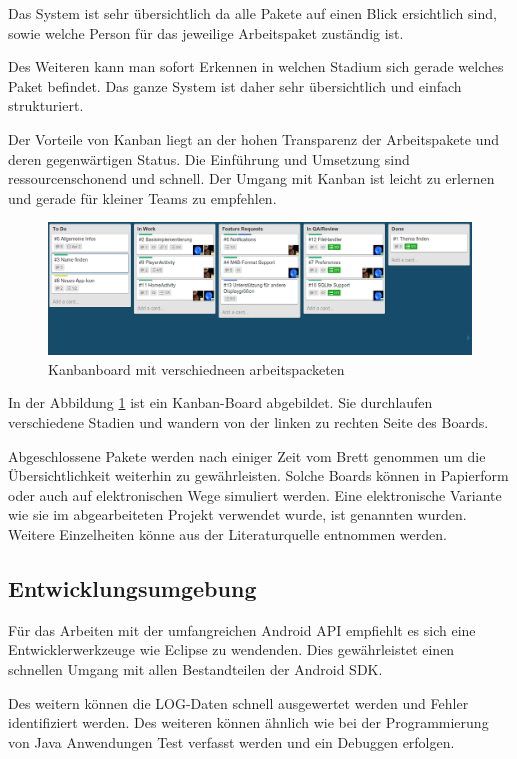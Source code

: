 Das System ist sehr übersichtlich da alle Pakete auf einen Blick ersichtlich sind, sowie welche Person für das jeweilige Arbeitspaket zuständig ist.\newpage

Des Weiteren kann man sofort Erkennen in welchen Stadium sich gerade welches Paket befindet. Das ganze System ist daher sehr übersichtlich und einfach strukturiert.

Der Vorteile von Kanban liegt an der hohen Transparenz der Arbeitspakete und deren gegenwärtigen Status. Die Einführung und Umsetzung sind ressourcenschonend und schnell. Der Umgang mit Kanban ist leicht zu erlernen und gerade für kleiner Teams zu empfehlen.

\begin{figure}
\begin{center}
\includegraphics[scale=0.35]{images/kanban}
\caption{Kanbanboard mit verschiedneen arbeitspacketen}
\label{kanban}
\end{center}
\end{figure}

In der Abbildung \ref{kanban} ist ein Kanban-Board abgebildet. Sie durchlaufen verschiedene Stadien und wandern von der linken zu rechten Seite des Boards.

Abgeschlossene Pakete werden nach einiger Zeit vom Brett genommen um die Übersichtlichkeit weiterhin zu gewährleisten. Solche Boards können in Papierform oder auch auf elektronischen Wege simuliert werden. Eine elektronische Variante wie sie im abgearbeiteten Projekt verwendet wurde, ist genannten wurden. Weitere Einzelheiten könne aus der Literaturquelle \cite{9783898647304} entnommen werden.

\subsection{Entwicklungsumgebung}
Für das Arbeiten mit der umfangreichen Android API empfiehlt es sich eine Entwicklerwerkzeuge wie Eclipse zu wendenden. Dies gewährleistet einen schnellen Umgang mit allen Bestandteilen der Android SDK.

Des weitern können die LOG-Daten schnell ausgewertet werden und Fehler identifiziert werden. Des weiteren können ähnlich wie bei der Programmierung von Java Anwendungen Test verfasst werden und ein Debuggen erfolgen.

